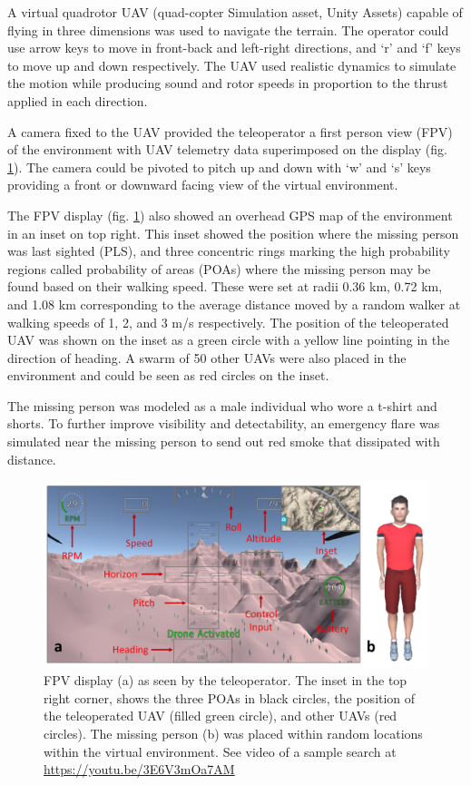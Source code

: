 \documentclass{article}
\begin{document}
	A virtual quadrotor UAV (quad-copter Simulation asset, Unity Assets) capable of flying in three dimensions was used to navigate the terrain. The operator could use arrow keys to move in front-back and left-right directions, and `r' and `f' keys to move up and down respectively. The UAV used realistic dynamics to simulate the motion while producing sound and rotor speeds in proportion to the thrust applied in each direction. 
	
	A camera fixed to the UAV provided the teleoperator a first person view (FPV) of the environment with UAV telemetry data superimposed on the display (fig. \ref{fig:HUDandMissingPerson}).  The camera could be pivoted to pitch up and down with `w' and `s' keys providing a front or downward facing view of the virtual environment. 
	
	The FPV display (fig. \ref{fig:HUDandMissingPerson}) also showed an overhead GPS map of the environment in an inset on top right. This inset showed the position where the missing person was last sighted (PLS), and three concentric rings marking the high probability regions called probability of areas (POAs) where the missing person may be found based on their walking speed. These were set at radii 0.36 km, 0.72 km, and 1.08 km corresponding to the average distance moved by a random walker at walking speeds of 1, 2, and 3 m/s respectively. The position of the teleoperated UAV was shown on the inset as a green circle with a yellow line pointing in the direction of heading. A swarm of 50 other UAVs were also placed in the environment and could be seen as red circles on the inset. 
	
	The missing person was modeled as a male individual who wore a t-shirt and shorts. To further improve visibility and detectability, an emergency flare was simulated near the missing person to send out red smoke that dissipated with distance. %
	
	
	\begin{figure}[ht!]
		\centering
		\includegraphics[width=0.99\linewidth]{images/hud.png}
		\caption[width=0.99\linewidth]{ FPV display (a) as seen by the teleoperator. The inset in the top right corner, shows the three POAs in black circles, the position of the teleoperated UAV (filled green circle), and other UAVs (red circles). The missing person (b) was placed within random locations within the virtual environment. See video of a sample search at \url{https://youtu.be/3E6V3mOa7AM} }
		\label{fig:HUDandMissingPerson}
	\end{figure}
	
\end{document}
